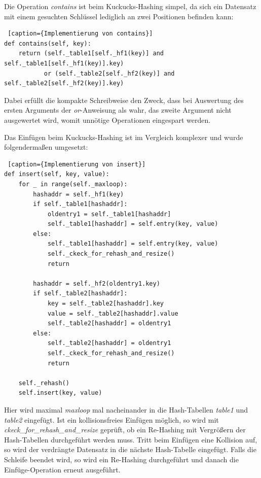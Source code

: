 Die Operation \textit{contains} ist beim Kuckucks-Hashing simpel, da sich ein Datensatz mit einem gesuchten Schlüssel lediglich an zwei Positionen befinden kann:
\begin{lstlisting} [caption={Implementierung von contains}]
def contains(self, key):
	return (self._table1[self._hf1(key)] and self._table1[self._hf1(key)].key) 
	       or (self._table2[self._hf2(key)] and self._table2[self._hf2(key)].key)
\end{lstlisting}
Dabei erfüllt die kompakte Schreibweise den Zweck, dass bei Auswertung des ersten Arguments der \textit{or}-Anweisung als wahr, das zweite Argument nicht ausgewertet wird, womit unnötige Operationen eingespart werden.

Das Einfügen beim Kuckucks-Hashing ist im Vergleich komplexer und wurde folgendermaßen umgesetzt:
\begin{lstlisting} [caption={Implementierung von insert}]
def insert(self, key, value):
    for _ in range(self._maxloop):
        hashaddr = self._hf1(key)
        if self._table1[hashaddr]:
            oldentry1 = self._table1[hashaddr]
            self._table1[hashaddr] = self.entry(key, value)
        else:
            self._table1[hashaddr] = self.entry(key, value)
            self._ckeck_for_rehash_and_resize()
            return

        hashaddr = self._hf2(oldentry1.key)
        if self._table2[hashaddr]:
            key = self._table2[hashaddr].key
            value = self._table2[hashaddr].value
            self._table2[hashaddr] = oldentry1
        else:
            self._table2[hashaddr] = oldentry1
            self._ckeck_for_rehash_and_resize()
            return

    self._rehash()
    self.insert(key, value)
\end{lstlisting}
Hier wird maximal \textit{maxloop} mal nacheinander in die Hash-Tabellen \textit{table1} und \textit{table2} eingefügt. Ist ein kollisionsfreies Einfügen möglich, so wird mit \textit{ckeck\_for\_rehash\_and\_resize} geprüft, ob ein Re-Hashing mit Vergrößern der Hash-Tabellen durchgeführt werden muss. Tritt beim Einfügen eine Kollision auf, so wird der verdrängte Datensatz in die nächste Hash-Tabelle eingefügt. Falls die Schleife beendet wird, so wird ein Re-Hashing durchgeführt und danach die Einfüge-Operation erneut ausgeführt.

